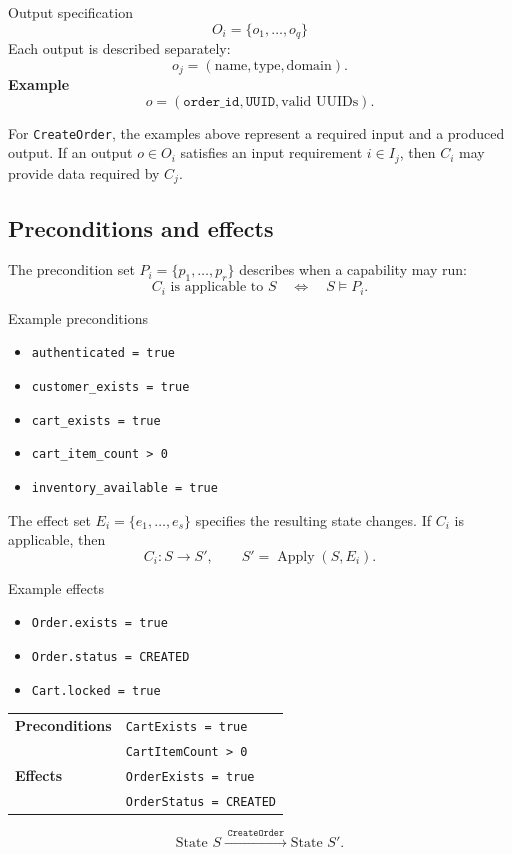 \documentclass[11pt]{article}
\newcommand{\code}[1]{\texttt{#1}}
\begin{document}
\begin{examplebox}{Output specification}
\[
 O_i=\{o_1,\ldots,o_q\}
\]
Each output is described separately:
\[
 o_j=(\text{name},\text{type},\text{domain}).
\]
\textbf{Example}
\[
o=(\code{order\_id},\code{UUID},\text{valid UUIDs}).
\]
\end{examplebox}

For \code{CreateOrder}, the examples above represent a required input and a produced
output. If an output \(o\in O_i\)
satisfies an input requirement \(i\in I_j\), then \(C_i\) may provide data required by
\(C_j\).

\subsection{Preconditions and effects}

The precondition set \(P_i=\{p_1,\ldots,p_r\}\) describes when a capability may run:
\[
  C_i\text{ is applicable to }S \quad\Longleftrightarrow\quad S\models P_i.
\]

\begin{examplebox}{Example preconditions}
\begin{itemize}[itemsep=0.45em]
\item \code{authenticated = true}
\item \code{customer\_exists = true}
\item \code{cart\_exists = true}
\item \code{cart\_item\_count > 0}
\item \code{inventory\_available = true}
\end{itemize}
\end{examplebox}

The effect set \(E_i=\{e_1,\ldots,e_s\}\) specifies the resulting state changes. If
\(C_i\) is applicable, then
\[
  C_i:S\longrightarrow S',\qquad S'=\operatorname{Apply}(S,E_i).
\]
\begin{examplebox}{Example effects}
\begin{itemize}[itemsep=0.45em]
\item \code{Order.exists = true}
\item \code{Order.status = CREATED}
\item \code{Cart.locked = true}
\end{itemize}
\end{examplebox}

\begin{keybox}[title={Example capability: CreateOrder}]
\begin{tabularx}{\textwidth}{@{}L{2.7cm}Y@{}}
\textbf{Preconditions} & \code{CartExists = true}\\
& \code{CartItemCount > 0} \\[0.65em]
\textbf{Effects} & \code{OrderExists = true}\\
& \code{OrderStatus = CREATED}
\end{tabularx}
\[
  \text{State }S \xrightarrow{\;\code{CreateOrder}\;} \text{State }S'.
\]
\end{keybox}
\end{document}
